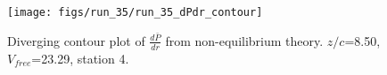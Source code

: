 \begin{figure}[H]
\centering
\texttt{[image: figs/run\_35/run\_35\_dPdr\_contour]}
\caption{Diverging contour plot of $\frac{d\bar{P}}{dr}$ from non-equilibrium theory. $z/c$=8.50, $V_{free}$=23.29, station 4.}
\label{fig:run_35_dPdr_contour}
\end{figure}


